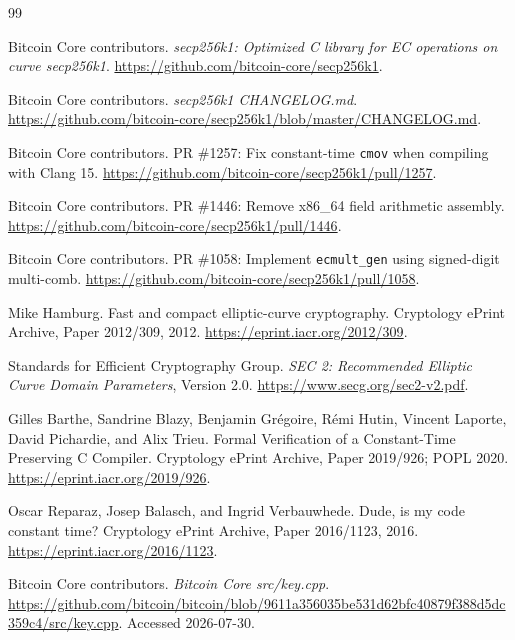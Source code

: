 \documentclass[UTF8,a4paper,zihao=-4]{ctexart}
\begin{document}
\begin{thebibliography}{99}

Bitcoin Core contributors.
\newblock \emph{secp256k1: Optimized C library for EC operations on curve secp256k1}.
\newblock \url{https://github.com/bitcoin-core/secp256k1}.

Bitcoin Core contributors.
\newblock \emph{secp256k1 CHANGELOG.md}.
\newblock \url{https://github.com/bitcoin-core/secp256k1/blob/master/CHANGELOG.md}.

Bitcoin Core contributors.
\newblock PR \#1257: Fix constant-time \texttt{cmov} when compiling with Clang 15.
\newblock \url{https://github.com/bitcoin-core/secp256k1/pull/1257}.

Bitcoin Core contributors.
\newblock PR \#1446: Remove x86\_64 field arithmetic assembly.
\newblock \url{https://github.com/bitcoin-core/secp256k1/pull/1446}.

Bitcoin Core contributors.
\newblock PR \#1058: Implement \texttt{ecmult\_gen} using signed-digit multi-comb.
\newblock \url{https://github.com/bitcoin-core/secp256k1/pull/1058}.

Mike Hamburg.
\newblock Fast and compact elliptic-curve cryptography.
\newblock Cryptology ePrint Archive, Paper 2012/309, 2012.
\newblock \url{https://eprint.iacr.org/2012/309}.

Standards for Efficient Cryptography Group.
\newblock \emph{SEC 2: Recommended Elliptic Curve Domain Parameters}, Version 2.0.
\newblock \url{https://www.secg.org/sec2-v2.pdf}.

Gilles Barthe, Sandrine Blazy, Benjamin Grégoire, Rémi Hutin,
Vincent Laporte, David Pichardie, and Alix Trieu.
\newblock Formal Verification of a Constant-Time Preserving C Compiler.
\newblock Cryptology ePrint Archive, Paper 2019/926; POPL 2020.
\newblock \url{https://eprint.iacr.org/2019/926}.

Oscar Reparaz, Josep Balasch, and Ingrid Verbauwhede.
\newblock Dude, is my code constant time?
\newblock Cryptology ePrint Archive, Paper 2016/1123, 2016.
\newblock \url{https://eprint.iacr.org/2016/1123}.

Bitcoin Core contributors.
\newblock \emph{Bitcoin Core src/key.cpp}.
\newblock \url{https://github.com/bitcoin/bitcoin/blob/9611a356035be531d62bfc40879f388d5dc359c4/src/key.cpp}.
\newblock Accessed 2026-07-30.


\end{thebibliography}
\end{document}
